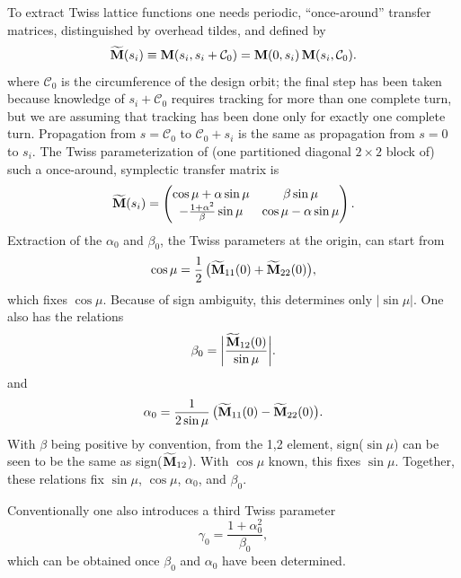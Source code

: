 \documentclass[]{article}
\begin{document}
To extract Twiss lattice functions one needs periodic, ``once-around'' transfer 
matrices, distinguished by overhead tildes, and defined by
%
\begin{equation}
{\widetilde{\bf M}}(s_i)
 \equiv
{\bf M}(s_i,s_i+\mathcal{C}_0)
 =
{\bf M}(0,s_i)\,
{\bf M}(s_i,\mathcal{C}_0).
\label{TM.3}
\end{equation}
%
where $\mathcal{C}_0$ is the circumference of the design
orbit; the final step has been taken because knowledge of
$s_i+\mathcal{C}_0$ requires tracking for more than one
complete turn, but we are assuming that tracking has been
done only for exactly one complete turn. Propagation from
$s=\mathcal{C}_0$ to $\mathcal{C}_0+s_i$ is the same as
propagation from $s=0$ to $s_i$. The Twiss parameterization of 
(one partitioned diagonal
$2\times2$ block of) such a once-around, symplectic 
transfer matrix is
%
\begin{equation}
{\widetilde{\bf M}}(s_i)
 =
\begin{pmatrix}
\cos\mu + \alpha\sin\mu          & \beta\sin\mu \\
-\frac{1+\alpha^2}{\beta}\sin\mu & \cos\mu - \alpha\sin\mu 
\end{pmatrix}.
\label{TM.4}
\end{equation}
%
Extraction of the $\alpha_0$ and $\beta_0$, the Twiss parameters 
at the origin, can start from
%
\begin{equation}
\cos\mu
 = 
\frac{1}{2}\,\big({\widetilde{\bf M}}_{11}(0) + {\widetilde{\bf M}}_{22}(0)\big),
\label{TM.5}
\end{equation}
%
which fixes $\cos\mu$. Because of sign ambiguity, this determines only
$|\sin\mu|$. One also has the relations
%
\begin{equation}
\beta_0
 = 
\bigg|
\frac{\widetilde{\bf M}_{12}(0)}{\sin\mu}
\bigg|.
\label{TM.6}
\end{equation}
%
and
%
\begin{equation}
\alpha_0
 = 
\frac{1}{2\sin\mu}\,
\big({\widetilde{\bf M}}_{11}(0) - {\widetilde{\bf M}}_{22}(0)\big).
\label{TM.7}
\end{equation}
%
With $\beta$ being positive by convention, 
from the 1,2 element, sign($\sin\mu$) can be seen to be
the same as sign(${\widetilde{\bf M}}_{12}$). With $\cos\mu$ known,
this fixes $\sin\mu$.
Together, these relations fix $\sin\mu$, $\cos\mu$, $\alpha_0$, and $\beta_0$.

Conventionally one also introduces a third Twiss parameter
%
\begin{equation}
\gamma_0
 = 
\frac{1+\alpha_0^2}{\beta_0},
\label{TM.8}
\end{equation}
%
which can be obtained once $\beta_0$ and $\alpha_0$
have been determined. 
\end{document}
